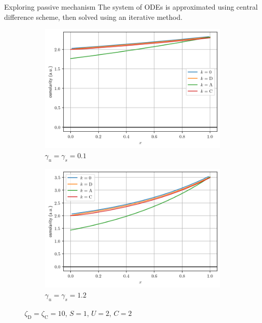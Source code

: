 \documentclass{beamer}
\begin{document}
\begin{frame}{Exploring passive mechanism}
    The system of ODEs is approximated using central difference scheme, then solved using an iterative method.
    \begin{figure}
        \centering
        \begin{subfigure}{0.5\textwidth}
            \centering
            \includegraphics[width=\linewidth]{../results/7-20-2023/osm_low_solute_perm.png}
            \caption{$\gamma_u = \gamma_s = 0.1$}
            \label{fig:low_sol_perm}
            \vspace*{4mm}
        \end{subfigure}%
        \begin{subfigure}{0.5\textwidth}
            \centering
            \includegraphics[width=\linewidth]{../results/7-20-2023/osm_high_solute_perm.png}
            \caption{$\gamma_u = \gamma_s = 1.2$}
            \label{fig:high_sol_perm}
        \end{subfigure}
        \caption{$\zeta_\mathrm{D} = \zeta_\mathrm{C} = 10$, $S = 1$, $U = 2$, $C = 2$}
        \label{fig:typical_sol}
    \end{figure}
\end{frame}
\end{document}
